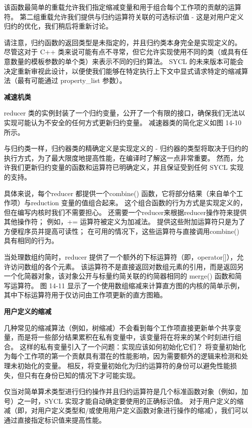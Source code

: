 该函数最简单的重载允许我们指定缩减变量和用于组合每个工作项的贡献的运算符。 第二组重载允许我们提供与归约运算符关联的可选标识值 - 这是对用户定义归约的优化，我们稍后将重新讨论。

请注意，归约函数的返回类型是未指定的，并且归约类本身完全是实现定义的。 尽管这对于 C++ 类来说可能有点不寻常，但它允许实现使用不同的类（或具有任意数量的模板参数的单个类）来表示不同的归约算法。 SYCL 的未来版本可能会决定重新审视此设计，以便使我们能够在特定执行上下文中显式请求特定的缩减算法（最有可能通过 property\_list 参数）。

\textbf{减速机类}

reducer 类的实例封装了一个归约变量，公开了一个有限的接口，确保我们无法以实现可能认为不安全的任何方式更新归约变量。 减速器类的简化定义如图 14-10 所示。

与归约类一样，归约器类的精确定义是实现定义的 - 归约器的类型将取决于归约的执行方式，为了最大限度地提高性能，在编译时了解这一点非常重要。 然而，允许我们更新归约变量的函数和运算符已明确定义，并且保证受到任何 SYCL 实现的支持。

具体来说，每个reducer 都提供一个combine() 函数，它将部分结果（来自单个工作项）与reduction 变量的值组合起来。 这个组合函数的行为方式是实现定义的，但在编写内核时我们不需要担心。 还需要一个reducer来根据reducer操作符来提供其他操作符； 例如，+= 运算符被定义为加减法。 提供这些附加运算符只是为了方便程序员并提高可读性； 在可用的情况下，这些运算符与直接调用combine() 具有相同的行为。

当处理数组约简时，reducer 提供了一个额外的下标运算符（即，operator[]），允许访问数组的各个元素。 该运算符不是直接返回对数组元素的引用，而是返回另一个化简器对象，该对象公开与标量约简关联的约简器相同的 merge() 函数和简写运算符。 图 14-11 显示了一个使用数组缩减来计算直方图的内核的简单示例，其中下标运算符用于仅访问由工作项更新的直方图箱。

\textbf{用户定义的缩减}

几种常见的缩减算法（例如，树缩减）不会看到每个工作项直接更新单个共享变量，而是将一些部分结果累积在私有变量中，该变量将在将来的某个时刻进行组合。 这样的私有变量引入了一个问题：实现应该如何初始化它们？ 将变量初始化为每个工作项的第一个贡献具有潜在的性能影响，因为需要额外的逻辑来检测和处理未初始化的变量。 相反，将变量初始化为归约运算符的身份可以避免性能损失，但只有在身份已知的情况下才可能实现。

仅当对简单算术类型进行归约操作并且归约运算符是几个标准函数对象（例如，加号）之一时，SYCL 实现才能自动确定要使用的正确标识值。 对于用户定义的缩减（即，对用户定义类型和/或使用用户定义函数对象进行操作的缩减），我们可以通过直接指定标识值来提高性能。


